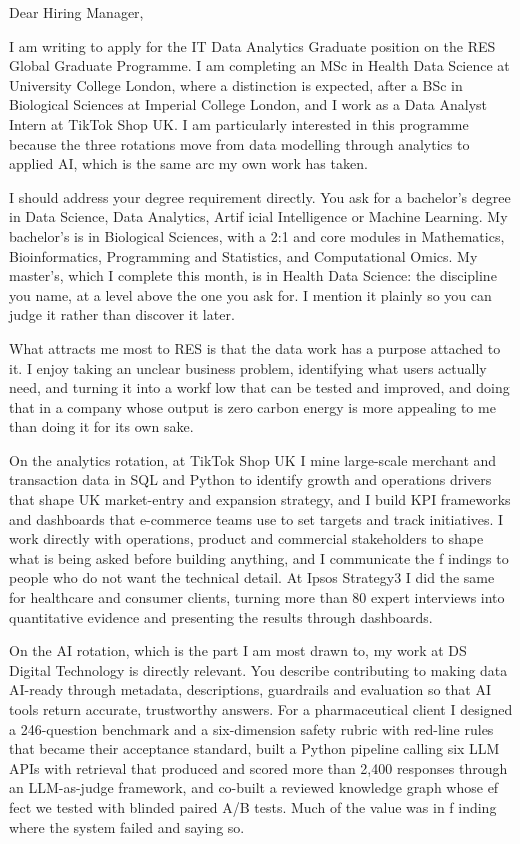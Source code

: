 \documentclass[letterpaper,11pt]{article}
\begin{document}
Dear Hiring Manager,

I am writing to apply for the IT Data Analytics Graduate position on the RES Global Graduate Programme. I am completing an MSc in Health Data Science at University College London, where a distinction is expected, after a BSc in Biological Sciences at Imperial College London, and I work as a Data Analyst Intern at TikTok Shop UK. I am particularly interested in this programme because the three rotations move from data modelling through analytics to applied AI, which is the same arc my own work has taken.

I should address your degree requirement directly. You ask for a bachelor's degree in Data Science, Data Analytics, Artif\kern0pt icial Intelligence or Machine Learning. My bachelor's is in Biological Sciences, with a 2:1 and core modules in Mathematics, Bioinformatics, Programming and Statistics, and Computational Omics. My master's, which I complete this month, is in Health Data Science: the discipline you name, at a level above the one you ask for. I mention it plainly so you can judge it rather than discover it later.

What attracts me most to RES is that the data work has a purpose attached to it. I enjoy taking an unclear business problem, identifying what users actually need, and turning it into a workf\kern0pt low that can be tested and improved, and doing that in a company whose output is zero carbon energy is more appealing to me than doing it for its own sake.

On the analytics rotation, at TikTok Shop UK I mine large-scale merchant and transaction data in SQL and Python to identify growth and operations drivers that shape UK market-entry and expansion strategy, and I build KPI frameworks and dashboards that e-commerce teams use to set targets and track initiatives. I work directly with operations, product and commercial stakeholders to shape what is being asked before building anything, and I communicate the f\kern0pt indings to people who do not want the technical detail. At Ipsos Strategy3 I did the same for healthcare and consumer clients, turning more than 80 expert interviews into quantitative evidence and presenting the results through dashboards.

On the AI rotation, which is the part I am most drawn to, my work at DS Digital Technology is directly relevant. You describe contributing to making data AI-ready through metadata, descriptions, guardrails and evaluation so that AI tools return accurate, trustworthy answers. For a pharmaceutical client I designed a 246-question benchmark and a six-dimension safety rubric with red-line rules that became their acceptance standard, built a Python pipeline calling six LLM APIs with retrieval that produced and scored more than 2,400 responses through an LLM-as-judge framework, and co-built a reviewed knowledge graph whose ef\kern0pt fect we tested with blinded paired A/B tests. Much of the value was in f\kern0pt inding where the system failed and saying so.
\end{document}
